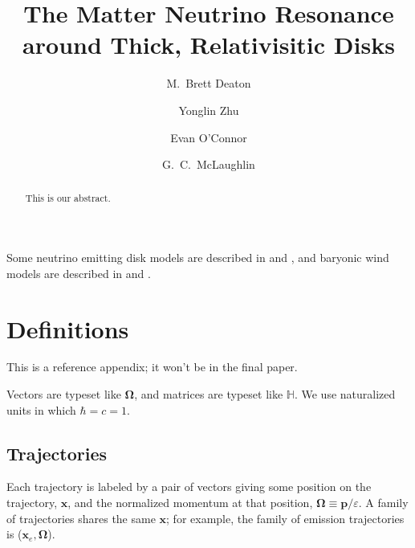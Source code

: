 \documentclass[aps,prd,twocolumn,superscriptaddress,groupedaddress]{revtex4}
\begin{document}
\widetext
{}

\title{The Matter Neutrino Resonance around Thick, Relativisitic Disks}

\author{M.\ Brett Deaton}

\author{Yonglin Zhu}

\author{Evan O'Connor}
 
\author{G.\ C.\ McLaughlin}


\begin{abstract}
  This is our abstract.
\end{abstract}

\maketitle

Some neutrino emitting disk models are described in \cite{fouc2015-bhns_m1} and
\cite{fouc2016-nsns}, and baryonic wind models are described in
\cite{metz2014-red_or_blue} and \cite{fern2015-outflows_bh_spin}.


\appendix

\section{Definitions}

This is a reference appendix; it won't be in the final paper.

Vectors are typeset like $\bm{\Omega}$,
and matrices are typeset like $\mathbb{H}$.
We use naturalized units in which $\hbar=c=1$.

\subsection*{Trajectories}
\label{ssc:trajectories}
Each trajectory is labeled by a pair of vectors
giving some position on the trajectory, $\bm{x}$,
and the normalized momentum at that position,
$\bm{\Omega}\equiv\bm{p}/\varepsilon$.
A family of trajectories shares the same $\bm{x}$; for example,
the family of emission trajectories is ($\bm{x}_e,\bm{\Omega}$).
\end{document}

